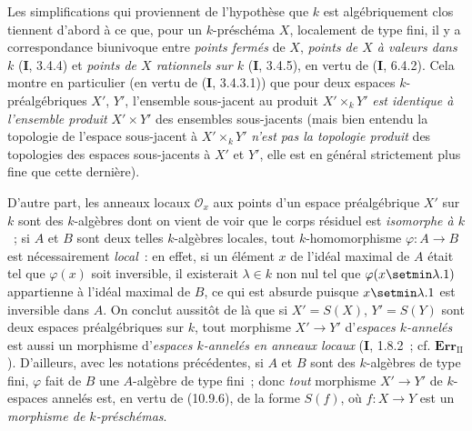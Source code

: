 \begin{env}[10.10.3]
\label{IV.10.10.3-fr}
Les simplifications qui proviennent de l'hypothèse que $k$ est algébriquement
clos tiennent d'abord à ce que, pour un $k$-préschéma $X$, localement de type
fini, il y a correspondance biunivoque entre \emph{points fermés} de $X$,
\emph{points de $X$ à valeurs dans $k$} (\textbf I, 3.4.4) et \emph{points de
$X$ rationnels sur $k$} (\textbf I, 3.4.5), en vertu de (\textbf I, 6.4.2).
Cela montre en particulier (en vertu de (\textbf I, 3.4.3.1)) que pour deux
espaces $k$-préalgébriques $X'$, $Y'$, l'ensemble sous-jacent au produit
$X'\times_kY'$ \emph{est identique à l'ensemble produit} $X'\times Y'$ des
ensembles sous-jacents (mais bien entendu la topologie de l'espace sous-jacent
à $X'\times_kY'$ \emph{n'est pas la topologie produit} des topologies des
espaces sous-jacents à $X'$ et $Y'$, elle est en général strictement plus fine
que cette dernière).

D'autre part, les anneaux locaux $\mathcal O_x$ aux points d'un espace
préalgébrique $X'$ sur $k$ sont des $k$-algèbres dont on vient de voir que le
corps résiduel est \emph{isomorphe à $k$}~; si $A$ et $B$ sont deux telles
$k$-algèbres locales, tout $k$-homomorphisme $\varphi:A\to B$ est
nécessairement \emph{local}~: en effet, si un élément $x$ de l'idéal maximal de
$A$ était tel que $\varphi(x)$ soit inversible, il existerait $\lambda\in k$
non nul tel que $\varphi(x\setmin\lambda.1)$ appartienne à l'idéal maximal de $B$, ce
qui est absurde puisque $x\setmin\lambda.1$ est inversible dans $A$. On conclut
aussitôt de là que si $X'=S(X)$, $Y'=S(Y)$ sont deux espaces préalgébriques sur
$k$, tout morphisme $X'\to Y'$ d'\emph{espaces $k$-annelés} est aussi un morphisme
d'\emph{espaces $k$-annelés en anneaux locaux} (\textbf I, 1.8.2~; cf.
$\mathbf{Err}_{\mathrm{II}}$). D'ailleurs, avec les notations précédentes, si
$A$ et $B$ sont des $k$-algèbres de type fini, $\varphi$ fait de $B$ une
$A$-algèbre de type fini~; donc \emph{tout} morphisme $X'\to Y'$ de $k$-espaces
annelés est, en vertu de (10.9.6), de la forme $S(f)$, où $f:X\to Y$ est un
\emph{morphisme de $k$-préschémas}.


\end{env}
